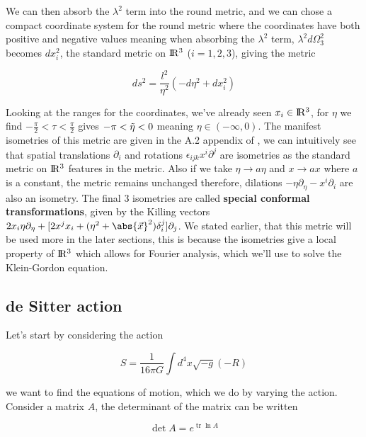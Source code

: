 \documentclass[a4paper,11pt]{article}
\numberwithin{equation}{section}
\numberwithin{figure}{section}
\begin{document}
\begin{large}
We can then absorb the $\lambda^2$ term into the round metric, and we can chose a compact coordinate system for the round metric where the coordinates have both positive and negative values meaning when absorbing the $\lambda^2$ term, $\lambda^2d\Omega^2_3$ becomes $dx^2_i$, the standard metric on $\rm I\!R^3$ ($i=1,2,3$), giving the metric

\begin{equation}
\label{planar metric}
    ds^2=\frac{l^2}{\eta^2}(-d\eta^2+dx_i^2)
\end{equation}

Looking at the ranges for the coordinates, we've already seen $x_i \in \rm I\!R^3$, for $\eta$ we find $-\frac{\pi}{2}<\tau<\frac{\pi}{2}$ gives $-\pi<\Tilde{\eta}<0$ meaning $\eta \in (-\infty,0)$. The manifest isometries of this metric are given in the A.2 appendix of \cite{Killing appendix}, we can intuitively see that spatial translations $\partial_i$ and rotations $\epsilon_{ijk}x^i\partial^j$ are isometries as the standard metric on $\rm I\!R^3$ features in the metric. Also if we take $\eta \rightarrow a\eta$ and $x \rightarrow ax$ where $a$ is a constant, the metric remains unchanged therefore, dilations $-\eta\partial_{\eta}-x^i\partial_i$ are also an isometry. The final 3 isometries are called \textbf{special conformal transformations}, given by the Killing vectors $2x_i\eta\partial_{\eta}+[2x^jx_i+(\eta^2+\abs{\Vec{x}}^2)\delta^j_i]\partial_j$. We stated earlier, that this metric will be used more in the later sections, this is because the isometries give a local property of $\rm I\!R^3$ which allows for Fourier analysis, which we'll use to solve the Klein-Gordon equation. 


\subsection{de Sitter action}

Let's start by considering the action

\begin{equation}
\label{de Sitter action}
    S=\frac{1}{16\pi G} \int d^4x \sqrt{-g} (-R)
\end{equation}

we want to find the equations of motion, which we do by varying the action. Consider a matrix $A$, the determinant of the matrix can be written

\begin{equation}
\label{det A}   
    \det A=e^{\operatorname{tr}\ln A}
\end{equation}


\end{large}
\end{document}
